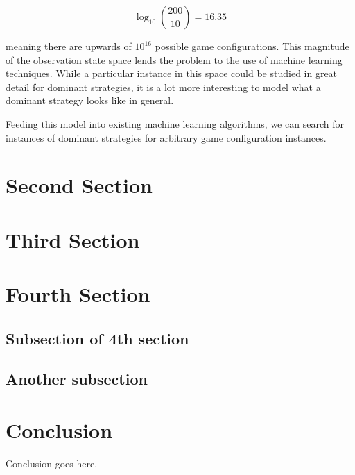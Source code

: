 \documentclass{acm_proc_article-sp}
\begin{document}
$$\log_{10}{\binom{200}{10}} = 16.35$$

meaning there are upwards of $10^{16}$ possible game configurations. This
magnitude of the observation state space lends the problem to the use
of machine learning techniques. While a particular instance in this space
could be studied in great detail for dominant strategies, it is a lot more
interesting to model what a dominant strategy looks like in general.

Feeding this model into existing machine learning algorithms, we can search for
instances of dominant strategies for arbitrary game configuration instances.

\section{Second Section}

\section{Third Section}

\section{Fourth Section}

\subsection{Subsection of 4th section}
\subsection{Another subsection}

\section{Conclusion}
Conclusion goes here.

\begin{biblist}
\end{biblist}

\balancecolumns
\end{document}
